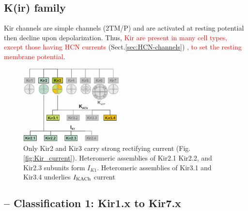 \subsection{K(ir) family}
\label{sec:K+-inward-rectifier}
\label{sec:inward-rectifier-Kir}
\label{sec:anomalous-rectification}
\label{sec:Kir-family}



Kir channels are simple channels (2TM/P) and are activated at resting potential
then decline upon depolarization. Thus, \textcolor{red}{Kir are present in many
cell types, except those having HCN currents} (Sect.\ref{sec:HCN-channels})
\textcolor{red}{, to  set the resting membrane potential}. 


\begin{figure}[hbt]
  \centerline{\includegraphics[height=4cm,
    angle=0]{./images/Kir_family.eps}}
\caption{Only Kir2 and Kir3 carry strong rectifying
  current (Fig.\ref{fig:Kir_current}). Heteromeric assemblies of Kir2.1 Kir2.2,
  and Kir2.3 subunits form $I_{K1}$. Heteromeric assemblies of Kir3.1 and Kir3.4
  underlies $I_{\ce{KACh}}$ current}
\label{fig:Kir_family}
\end{figure}


\subsection{-- Classification 1: Kir1.x to Kir7.x}
\label{sec:Kir-classification-genes-based}

